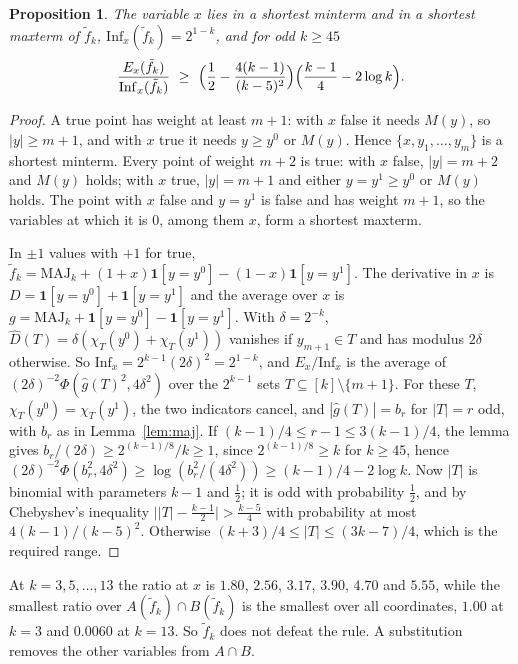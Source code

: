 \documentclass[11pt]{amsart}
\newtheorem{proposition}[theorem]{Proposition}
\theoremstyle{remark}
\newcommand{\Inf}{\mathrm{Inf}}
\newcommand{\MAJ}{\mathrm{MAJ}}
\begin{document}
\begin{proposition}\label{prop:both}
The variable $x$ lies in a shortest minterm and in a shortest maxterm of $\tilde f_k$, $\Inf_x(\tilde f_k)=2^{1-k}$,
and for odd $k\ge45$
\[
\frac{E_x(\tilde f_k)}{\Inf_x(\tilde f_k)}\ \ge\ \Bigl(\frac12-\frac{4(k-1)}{(k-5)^2}\Bigr)\Bigl(\frac{k-1}4-2\log k\Bigr).
\]
\end{proposition}

\begin{proof}
A true point has weight at least $m+1$: with $x$ false it needs $M(y)$, so $|y|\ge m+1$, and with $x$ true it needs
$y\ge y^0$ or $M(y)$. Hence $\{x,y_1,\dots,y_m\}$ is a shortest minterm. Every point of weight $m+2$ is true: with $x$
false, $|y|=m+2$ and $M(y)$ holds; with $x$ true, $|y|=m+1$ and either $y=y^1\ge y^0$ or $M(y)$ holds. The point
with $x$ false and $y=y^1$ is false and has weight $m+1$, so the variables at which it is $0$, among them $x$, form a
shortest maxterm.

In $\pm1$ values with $+1$ for true, $\tilde f_k=\MAJ_k+(1+x)\mathbf 1[y=y^0]-(1-x)\mathbf 1[y=y^1]$. The derivative in
$x$ is $D=\mathbf 1[y=y^0]+\mathbf 1[y=y^1]$ and the average over $x$ is $g=\MAJ_k+\mathbf 1[y=y^0]-\mathbf
1[y=y^1]$. With $\delta=2^{-k}$, $\hat D(T)=\delta(\chi_T(y^0)+\chi_T(y^1))$ vanishes if $y_{m+1}\in T$ and has
modulus $2\delta$ otherwise. So $\Inf_x=2^{k-1}(2\delta)^2=2^{1-k}$, and $E_x/\Inf_x$ is the average of
$(2\delta)^{-2}\Phi(\hat g(T)^2,4\delta^2)$ over the $2^{k-1}$ sets $T\subseteq[k]\setminus\{m+1\}$. For these
$T$, $\chi_T(y^0)=\chi_T(y^1)$, the two indicators cancel, and $|\hat g(T)|=b_r$ for $|T|=r$ odd, with $b_r$ as
in Lemma~\ref{lem:maj}. If $(k-1)/4\le r-1\le3(k-1)/4$, the lemma gives $b_r/(2\delta)\ge
2^{(k-1)/8}/k\ge1$, since $2^{(k-1)/8}\ge k$ for $k\ge45$, hence $(2\delta)^{-2}\Phi(b_r^2,4\delta^2)\ge\log(b_r^2/(4\delta^2))\ge(k-1)/4-2\log k$.
Now $|T|$ is binomial with parameters $k-1$ and $\frac12$; it is odd with probability $\frac12$, and by Chebyshev's
inequality $\bigl||T|-\frac{k-1}2\bigr|>\frac{k-5}4$ with probability at most $4(k-1)/(k-5)^2$. Otherwise
$(k+3)/4\le|T|\le(3k-7)/4$, which is the required range.
\end{proof}

At $k=3,5,\dots,13$ the ratio at $x$ is $1.80$, $2.56$, $3.17$, $3.90$, $4.70$ and $5.55$, while the smallest ratio
over $A(\tilde f_k)\cap B(\tilde f_k)$ is the smallest over all coordinates, $1.00$ at $k=3$ and $0.0060$ at $k=13$.
So $\tilde f_k$ does not defeat the rule. A substitution removes the other variables from $A\cap B$.
\end{document}

